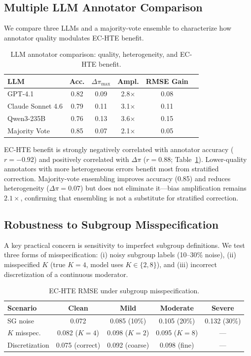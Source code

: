 \documentclass[11pt,a4paper]{article}
\begin{document}
\subsection{Multiple LLM Annotator Comparison}
\label{sec:multi_llm}

We compare three LLMs and a majority-vote ensemble to characterize how annotator quality modulates EC-HTE benefit.

\begin{table}[t]
\centering
\small
\caption{LLM annotator comparison: quality, heterogeneity, and EC-HTE benefit.}
\label{tab:multi_llm}
\begin{tabular}{lccccc}
\toprule
LLM & Acc. & $\Delta\pi_{\max}$ & Ampl. & RMSE Gain \\
\midrule
GPT-4.1 & 0.82 & 0.09 & 2.8$\times$ & 0.08 \\
Claude Sonnet 4.6 & 0.79 & 0.11 & 3.1$\times$ & 0.11 \\
Qwen3-235B & 0.76 & 0.13 & 3.6$\times$ & 0.15 \\
Majority Vote & 0.85 & 0.07 & 2.1$\times$ & 0.05 \\
\bottomrule
\end{tabular}
\end{table}

EC-HTE benefit is strongly negatively correlated with annotator accuracy ($r = -0.92$) and positively correlated with $\Delta\pi$ ($r = 0.88$; Table~\ref{tab:multi_llm}).
Lower-quality annotators with more heterogeneous errors benefit most from stratified correction.
Majority-vote ensembling improves accuracy (0.85) and reduces heterogeneity ($\Delta\pi = 0.07$) but does not eliminate it---bias amplification remains $2.1\times$, confirming that ensembling is not a substitute for stratified correction.

\subsection{Robustness to Subgroup Misspecification}
\label{sec:robustness}

A key practical concern is sensitivity to imperfect subgroup definitions.
We test three forms of misspecification: (i) noisy subgroup labels (10--30\% noise), (ii) misspecified $K$ (true $K=4$, model uses $K \in \{2, 8\}$), and (iii) incorrect discretization of a continuous moderator.

\begin{table}[t]
\centering
\small
\caption{EC-HTE RMSE under subgroup misspecification.}
\label{tab:robustness}
\begin{tabular}{lcccc}
\toprule
Scenario & Clean & Mild & Moderate & Severe \\
\midrule
SG noise & 0.072 & 0.085 (10\%) & 0.105 (20\%) & 0.132 (30\%) \\
$K$ misspec. & 0.082 ($K\!=\!4$) & 0.098 ($K\!=\!2$) & 0.095 ($K\!=\!8$) & --- \\
Discretization & 0.075 (correct) & 0.092 (coarse) & 0.098 (fine) & --- \\
\bottomrule
\end{tabular}
\end{table}
\end{document}
